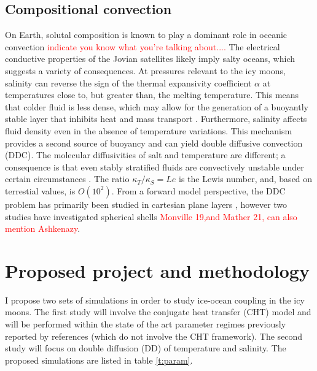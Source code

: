 \documentclass{article}
\begin{document}
\subsection{Compositional convection}
On Earth, solutal composition is known to play a dominant role in oceanic convection \textcolor{red}{indicate you know what you're talking about....} The electrical conductive properties of the Jovian satellites likely imply salty oceans\citep{cZ00}, which suggests a variety of consequences. At pressures relevant to the icy moons, salinity can reverse the sign of the thermal expansivity coefficient $\alpha$ at temperatures close to, but greater than, the melting temperature. This means that colder fluid is less dense, which may allow for the generation of a buoyantly stable layer that inhibits heat and mass transport \citep{aT64}. 
Furthermore, salinity affects fluid density even in the absence of temperature variations. This mechanism provides a second source of buoyancy and can yield double diffusive convection (DDC). The molecular diffusivities of salt and temperature are different; a consequence is that even stably stratified fluids are convectively unstable under certain circumstances \citep{tR13}. The ratio $\kappa_T/ \kappa_S=Le$ is the Lewis number, and, based on terrestial values, is $O(10^2)$.
From a forward model perspective, the DDC problem has primarily been studied in cartesian plane layers \citep{gM12,}, however two studies have investigated spherical shells \textcolor{red}{Monville 19,and Mather 21, can also mention Ashkenazy}.
\section{Proposed project and methodology}
I propose two sets of simulations in order to study ice-ocean coupling in the icy moons. The first study will involve the conjugate heat transfer (CHT) model and will be performed within the state of the art parameter regimes previously reported by references\citep{dL23,kS19} (which do not involve the CHT framework).
The second study will focus on double diffusion (DD) of temperature and salinity. The proposed simulations are listed in table \ref{t:param}.
\end{document}
